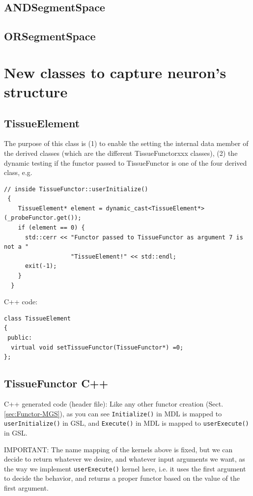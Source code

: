 \subsection{ANDSegmentSpace}
\label{sec:ANDSegmentSpace}

\subsection{ORSegmentSpace}
\label{sec:ORSegmentSpace}


\section{New classes to capture neuron's structure}

\subsection{TissueElement}
\label{sec:TissueElement}

The purpose of this class is (1) to enable the setting the internal data member
of the derived classes (which are the different TissueFunctorxxx classes), (2)
the dynamic testing if the functor passed to TissueFunctor is one of the four
derived class, e.g.
\begin{verbatim}
// inside TissueFunctor::userInitialize()
 {
    TissueElement* element = dynamic_cast<TissueElement*>(_probeFunctor.get());
    if (element == 0) {
      std::cerr << "Functor passed to TissueFunctor as argument 7 is not a "
                   "TissueElement!" << std::endl;
      exit(-1);
    }
  }
\end{verbatim}


C++ code:
\begin{verbatim}
class TissueElement
{
 public:
  virtual void setTissueFunctor(TissueFunctor*) =0;
};
\end{verbatim}

\subsection{TissueFunctor C++}
\label{sec:TissueFunctor-C++}

C++ generated code (header file): Like any other functor creation
(Sect.\ref{sec:Functor-MGS}), as you can see \verb!Initialize()! in MDL is mapped
to \verb!userInitialize()! in GSL, and \verb!Execute()! in MDL is mapped to
\verb!userExecute()! in GSL.

IMPORTANT: The name mapping of the kernels above is fixed, but we can decide to
return whatever we desire, and whatever input arguments we want, as the way we
implement \verb!userExecute()! kernel here, i.e. it uses the first argument to
decide the behavior, and returns a proper functor based on the value of the
first argument.


